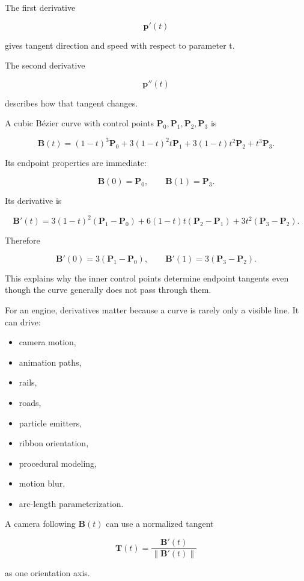 The first derivative

\[
\mathbf p'(t)
\]

gives tangent direction and speed with respect to parameter t.

The second derivative

\[
\mathbf p''(t)
\]

describes how that tangent changes.

A cubic Bézier curve with control points \(\mathbf P_0,\mathbf P_1,\mathbf P_2,\mathbf P_3\) is

\[
\mathbf B(t)
=
(1-t)^3\mathbf P_0
+
3(1-t)^2t\mathbf P_1
+
3(1-t)t^2\mathbf P_2
+
t^3\mathbf P_3.
\]

Its endpoint properties are immediate:

\[
\mathbf B(0)=\mathbf P_0,
\qquad
\mathbf B(1)=\mathbf P_3.
\]

Its derivative is

\[
\mathbf B'(t)
=
3(1-t)^2(\mathbf P_1-\mathbf P_0)
+
6(1-t)t(\mathbf P_2-\mathbf P_1)
+
3t^2(\mathbf P_3-\mathbf P_2).
\]

Therefore

\[
\mathbf B'(0)=3(\mathbf P_1-\mathbf P_0),
\qquad
\mathbf B'(1)=3(\mathbf P_3-\mathbf P_2).
\]

This explains why the inner control points determine endpoint tangents even though the curve generally does not pass through them.

For an engine, derivatives matter because a curve is rarely only a visible line. It can drive:

\begin{itemize}
\tightlist
\item
  camera motion,
\item
  animation paths,
\item
  rails,
\item
  roads,
\item
  particle emitters,
\item
  ribbon orientation,
\item
  procedural modeling,
\item
  motion blur,
\item
  arc-length parameterization.
\end{itemize}

A camera following \(\mathbf B(t)\) can use a normalized tangent

\[
\mathbf T(t)=
\frac{\mathbf B'(t)}
{\|\mathbf B'(t)\|}
\]

as one orientation axis.

